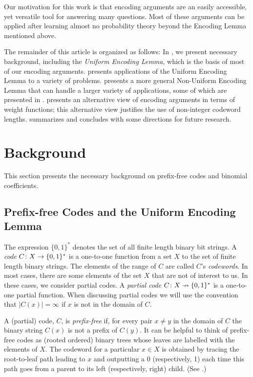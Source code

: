 \documentclass{patmorin}
\begin{document}
Our motivation for this work is that encoding arguments are an easily
accessible, yet versatile tool for answering many questions.  Most of
these arguments can be applied after learning almost no probability
theory beyond the Encoding Lemma mentioned above.

The remainder of this article is organized as follows: In ,
we present necessary background, including the \emph{Uniform
Encoding Lemma}, which is the basis of most of our encoding arguments.
 presents  applications of the Uniform Encoding
Lemma to a variety of problems.   presents a more
general Non-Uniform Encoding Lemma that can handle a larger variety of
applications, some of which are presented in .
 presents an alternative view of encoding arguments in
terms of weight functions; this alternative view justifies the use of
non-integer codeword lengths.   summarizes and concludes
with some directions for future research.



\section{Background}

This section presents the necessary background on prefix-free codes and binomial coefficients.

\subsection{Prefix-free Codes and the Uniform Encoding Lemma}

The expression $\{0, 1\}^*$ denotes the set of all finite length binary bit strings. A \emph{code} $C\colon X\to \{0,1\}^*$ is a one-to-one function from a set
$X$ to the set of finite length binary strings.  The elements of the range of $C$ are
called $C$'s \emph{codewords}.  In most cases, there are some elements of
the set $X$ that are not of interest to us.  In these cases, we consider
partial codes. A \emph{partial code} $C\colon X\nrightarrow \{0,1\}^*$ is
a one-to-one partial function.  When discussing partial codes we will use
the convention that $|C(x)|=\infty$ if $x$ is not in the domain of $C$.

A (partial) code, $C$, is \emph{prefix-free} if, for every pair $x\neq y$
in the domain of $C$ the binary string $C(x)$ is not a prefix of $C(y)$.
It can be helpful to think of prefix-free codes as (rooted ordered)
binary trees whose leaves are labelled with the elements of $X$.
The codeword for a particular $x\in X$ is obtained by tracing the
root-to-leaf path leading to $x$ and outputting a 0 (respectively, 1)
each time this path goes from a parent to its left (respectively, right)
child. (See .)
\end{document}
